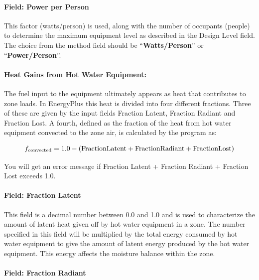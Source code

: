 \paragraph{Field: Power per Person}\label{field-power-per-person-1}

This factor (watts/person) is used, along with the number of occupants (people) to determine the maximum equipment level as described in the Design Level field. The choice from the method field should be ``\textbf{Watts/Person}'' or ``\textbf{Power/Person}''.

\paragraph{Heat Gains from Hot Water Equipment:}\label{heat-gains-from-hot-water-equipment}

The fuel input to the equipment ultimately appears as heat that contributes to zone loads. In EnergyPlus this heat is divided into four different fractions. Three of these are given by the input fields Fraction Latent, Fraction Radiant and Fraction Lost. A fourth, defined as the fraction of the heat from hot water equipment convected to the zone air, is calculated by the program as:

\begin{equation}
  f_{\rm{convected}} = 1.0 - (\rm{Fraction Latent} + \rm{Fraction Radiant} + \rm{Fraction Lost})
\end{equation}

You will get an error message if Fraction Latent + Fraction Radiant + Fraction Lost exceeds 1.0.

\paragraph{Field: Fraction Latent}\label{field-fraction-latent-2}

This field is a decimal number between 0.0 and 1.0 and is used to characterize the amount of latent heat given off by hot water equipment in a zone. The number specified in this field will be multiplied by the total energy consumed by hot water equipment to give the amount of latent energy produced by the hot water equipment. This energy affects the moisture balance within the zone.

\paragraph{Field: Fraction Radiant}\label{field-fraction-radiant-4}

